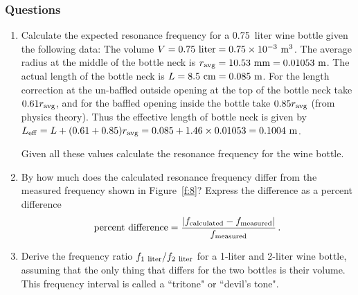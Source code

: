 \documentclass[11pt]{NSF}
\def\be{\begin{equation}}
\def\ee{\end{equation}}
\def\ben{\begin{enumerate}}
\def\een{\end{enumerate}}
\def\i{\item{}}
\begin{document}
\subsubsection*{Questions}
\ben
\i Calculate the expected resonance frequency for a 
0.75~liter wine bottle given the following data:
The volume $V= 0.75~{\rm liter} = 0.75\times10^{-3}~{\rm m}^3$.
The average radius at the middle of the bottle neck 
is $r_{\rm avg} = 10.53~{\rm mm} = 0.01053~{\rm m}$.
The actual length of the bottle neck is
$L = 8.5~{\rm cm} = 0.085~{\rm m}$. 
For the length correction at the un-baffled outside opening 
at the top of the bottle neck take $0.61 r_{\rm avg}$, 
and for the baffled opening inside the bottle take 
$0.85 r_{\rm avg}$ (from physics theory). 
Thus the effective length of bottle neck is given by 
$L_{\rm eff} = L +(0.61 + 0.85) r_{\rm avg} = 
0.085 + 1.46 \times 0.01053 = 0.1004~{\rm m}$. 

Given all these values calculate the resonance frequency
for the wine bottle.

\i By how much does the calculated resonance frequency
differ from the measured frequency shown in Figure~\ref{f:8}?
Express the difference as a percent difference
%
\be
\text{percent difference} = 
\frac{|f_{\rm calculated}-f_{\rm measured}|}{f_{\rm measured}}\,.
\ee

\i   Derive the frequency ratio $f_{\rm 1~liter}/f_{\rm 2~liter}$
for a 1-liter and 2-liter wine bottle, assuming that the only thing 
that differs for the two bottles is their volume.
This frequency interval is called a ``tritone" or ``devil's tone".
\een
\end{document}
